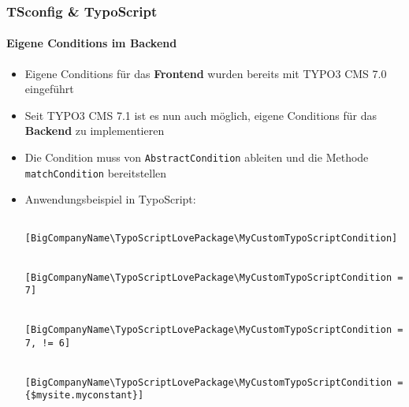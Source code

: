 \begin{frame}[fragile]
	\frametitle{TSconfig \& TypoScript}
	\framesubtitle{Eigene Conditions im Backend}

	\lstset{basicstyle=\tiny\ttfamily}

	\begin{itemize}

		\item Eigene Conditions für das \textbf{Frontend} wurden bereits mit TYPO3 CMS 7.0 eingeführt
		\item Seit TYPO3 CMS 7.1 ist es nun auch möglich, eigene Conditions für das \textbf{Backend} zu implementieren
		\item Die Condition muss von \texttt{AbstractCondition} ableiten und die Methode \texttt{matchCondition} bereitstellen
		\item Anwendungsbeispiel in TypoScript:

			\begin{lstlisting}
				[BigCompanyName\TypoScriptLovePackage\MyCustomTypoScriptCondition]

				[BigCompanyName\TypoScriptLovePackage\MyCustomTypoScriptCondition = 7]

				[BigCompanyName\TypoScriptLovePackage\MyCustomTypoScriptCondition = 7, != 6]

				[BigCompanyName\TypoScriptLovePackage\MyCustomTypoScriptCondition = {$mysite.myconstant}]
			\end{lstlisting}

	\end{itemize}

\end{frame}


